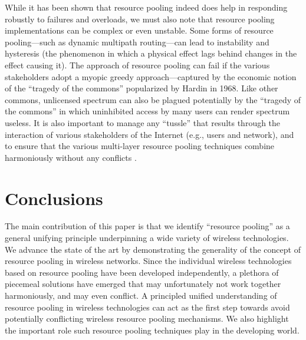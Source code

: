 \documentclass{sigcomm-alternate}
\begin{document}
While it has been shown that resource pooling indeed does help in responding robustly to failures and overloads, we must also note that resource pooling implementations can be complex or even unstable. Some forms of resource pooling---such as dynamic multipath routing---can lead to instability and hysteresis (the phenomenon in which a physical effect lags behind changes in the effect causing it). The approach of resource pooling can fail if the various stakeholders adopt a myopic greedy approach---captured by the economic notion of the ``tragedy of the commons'' popularized by Hardin in 1968. Like other commons, unlicensed spectrum can also be plagued potentially by the ``tragedy of the commons'' in which uninhibited access by many users can render spectrum useless. It is also important to manage any ``tussle'' that results \cite{clark2002tussle} through the interaction of various stakeholders of the Internet (e.g., users and network), and to ensure that the various multi-layer resource pooling techniques combine harmoniously without any conflicts \cite{wischik2008resource}.









\section{Conclusions}
\label{sec:conclusion}

The main contribution of this paper is that we identify ``resource pooling'' as a general unifying principle underpinning a wide variety of wireless technologies. We advance the state of the art by demonstrating the generality of the concept of resource pooling in wireless networks. Since the individual wireless technologies based on resource pooling have been developed independently, a plethora of piecemeal solutions have emerged that may unfortunately not work together harmoniously, and may even conflict. A principled unified understanding of resource pooling in wireless technologies can act as the first step towards avoid potentially conflicting wireless resource pooling mechanisms. We also highlight the important role such resource pooling techniques play in the developing world. 




{\footnotesize
}
\end{document}
